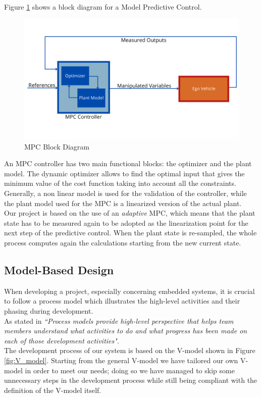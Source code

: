 Figure \ref{fig:MPC_Block} shows a block diagram for a Model Predictive Control.
\begin{figure}[H]
    \centering
    \includegraphics[width=1\textwidth]{Figures/mpcblock.png}
    \caption{MPC Block Diagram}
      \label{fig:MPC_Block}
\end{figure}
An MPC controller has two main functional blocks: the optimizer and the plant model.
The dynamic optimizer allows to find the optimal input that gives the minimum
value of the cost function taking into account all the constraints. Generally, a non linear model is used for the validation of the controller, while the plant model used for the MPC is a linearized version of the actual plant.\\
Our project is based on the use of an \emph{adaptive} MPC, which means that the plant state has to be measured again to be adopted as the linearization point for the next step of the predictive control. When the plant state is re-sampled, the whole process
computes again the calculations starting from the new current state.

\subsection{Model-Based Design}
When developing a project, especially concerning embedded systems, it is crucial to follow a process model which illustrates the high-level activities and their phasing during development.\\
As stated in \cite{FOWLER20151} \emph{``Process models provide high-level perspective that helps team members understand what activities to do and what progress  has been made on each of those development activities"}.\\
The development process of our system is based on the V-model shown in Figure \ref{fig:V_model}.
Starting from the general V-model we have tailored our own V-model in order to meet our needs; doing so we have managed to skip some unnecessary steps in the development process while still being compliant with the definition of the V-model itself.

